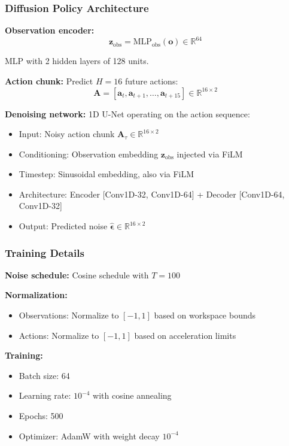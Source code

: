 \subsubsection{Diffusion Policy Architecture}

\textbf{Observation encoder:}
\begin{equation}
\mathbf{z}_{\text{obs}} = \text{MLP}_{\text{obs}}(\mathbf{o}) \in \mathbb{R}^{64}
\label{eq:example2_obs_encoder}
\end{equation}

MLP with 2 hidden layers of 128 units.

\textbf{Action chunk:} Predict $H = 16$ future actions:
\begin{equation}
\mathbf{A} = [\mathbf{a}_t, \mathbf{a}_{t+1}, \ldots, \mathbf{a}_{t+15}] \in \mathbb{R}^{16 \times 2}
\label{eq:example2_action_chunk}
\end{equation}

\textbf{Denoising network:} 1D U-Net operating on the action sequence:
\begin{itemize}
    \item Input: Noisy action chunk $\mathbf{A}_\tau \in \mathbb{R}^{16 \times 2}$
    \item Conditioning: Observation embedding $\mathbf{z}_{\text{obs}}$ injected via FiLM
    \item Timestep: Sinusoidal embedding, also via FiLM
    \item Architecture: Encoder [Conv1D-32, Conv1D-64] + Decoder [Conv1D-64, Conv1D-32]
    \item Output: Predicted noise $\hat{\boldsymbol{\epsilon}} \in \mathbb{R}^{16 \times 2}$
\end{itemize}

\subsubsection{Training Details}

\textbf{Noise schedule:} Cosine schedule with $T = 100$

\textbf{Normalization:}
\begin{itemize}
    \item Observations: Normalize to $[-1, 1]$ based on workspace bounds
    \item Actions: Normalize to $[-1, 1]$ based on acceleration limits
\end{itemize}

\textbf{Training:}
\begin{itemize}
    \item Batch size: 64
    \item Learning rate: $10^{-4}$ with cosine annealing
    \item Epochs: 500
    \item Optimizer: AdamW with weight decay $10^{-4}$
\end{itemize}

